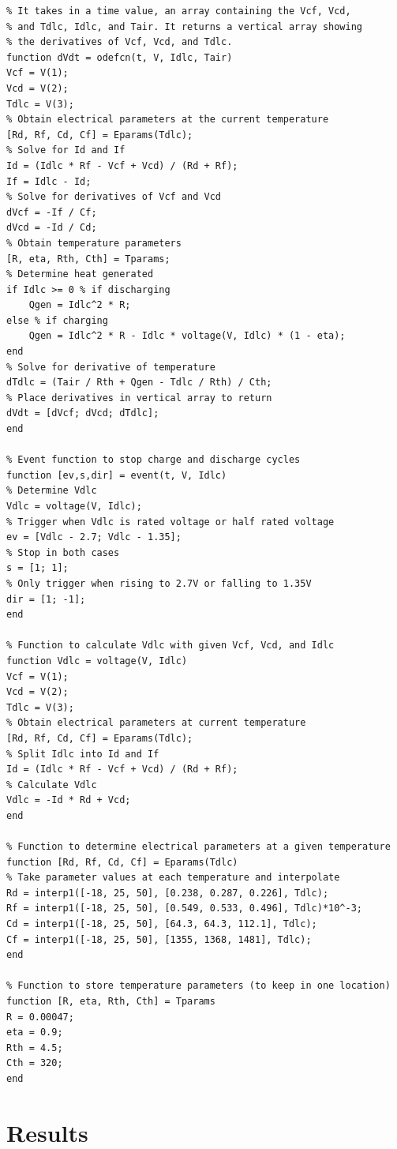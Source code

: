 \documentclass[fleqn]{article}
\begin{document}
\begin{lstlisting}[style=Matlab-editor]
% ODE function to determine how Vcf, Vcd, and Tdlc change.
% It takes in a time value, an array containing the Vcf, Vcd,
% and Tdlc, Idlc, and Tair. It returns a vertical array showing
% the derivatives of Vcf, Vcd, and Tdlc.
function dVdt = odefcn(t, V, Idlc, Tair)
Vcf = V(1);
Vcd = V(2);
Tdlc = V(3);
% Obtain electrical parameters at the current temperature
[Rd, Rf, Cd, Cf] = Eparams(Tdlc);
% Solve for Id and If
Id = (Idlc * Rf - Vcf + Vcd) / (Rd + Rf);
If = Idlc - Id;
% Solve for derivatives of Vcf and Vcd
dVcf = -If / Cf;
dVcd = -Id / Cd;
% Obtain temperature parameters
[R, eta, Rth, Cth] = Tparams;
% Determine heat generated
if Idlc >= 0 % if discharging
    Qgen = Idlc^2 * R;
else % if charging
    Qgen = Idlc^2 * R - Idlc * voltage(V, Idlc) * (1 - eta);
end
% Solve for derivative of temperature
dTdlc = (Tair / Rth + Qgen - Tdlc / Rth) / Cth;
% Place derivatives in vertical array to return
dVdt = [dVcf; dVcd; dTdlc];
end

% Event function to stop charge and discharge cycles
function [ev,s,dir] = event(t, V, Idlc)
% Determine Vdlc
Vdlc = voltage(V, Idlc);
% Trigger when Vdlc is rated voltage or half rated voltage
ev = [Vdlc - 2.7; Vdlc - 1.35];
% Stop in both cases
s = [1; 1];
% Only trigger when rising to 2.7V or falling to 1.35V
dir = [1; -1];
end

% Function to calculate Vdlc with given Vcf, Vcd, and Idlc
function Vdlc = voltage(V, Idlc)
Vcf = V(1);
Vcd = V(2);
Tdlc = V(3);
% Obtain electrical parameters at current temperature
[Rd, Rf, Cd, Cf] = Eparams(Tdlc);
% Split Idlc into Id and If
Id = (Idlc * Rf - Vcf + Vcd) / (Rd + Rf);
% Calculate Vdlc
Vdlc = -Id * Rd + Vcd;
end

% Function to determine electrical parameters at a given temperature
function [Rd, Rf, Cd, Cf] = Eparams(Tdlc)
% Take parameter values at each temperature and interpolate
Rd = interp1([-18, 25, 50], [0.238, 0.287, 0.226], Tdlc);
Rf = interp1([-18, 25, 50], [0.549, 0.533, 0.496], Tdlc)*10^-3;
Cd = interp1([-18, 25, 50], [64.3, 64.3, 112.1], Tdlc);
Cf = interp1([-18, 25, 50], [1355, 1368, 1481], Tdlc);
end

% Function to store temperature parameters (to keep in one location)
function [R, eta, Rth, Cth] = Tparams
R = 0.00047;
eta = 0.9;
Rth = 4.5;
Cth = 320;
end
\end{lstlisting}

\pagebreak

\section{Results}
\end{document}

